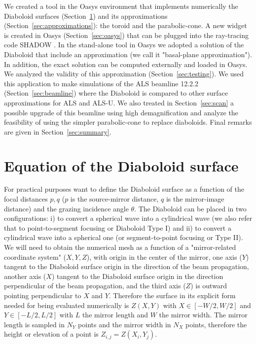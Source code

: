 \documentclass{iucr}              %
\begin{document}

We created a tool in the Oasys environment \cite{codeOASYS} that implements numerically the Diaboloid surfaces (Section~\ref{sec:DiaboloidEqs}) and its approximations (Section~\ref{sec:approximations}): the toroid and the parabolic-cone. A new widget is created in Oasys (Section~\ref{sec:oasys}) that can be plugged into the ray-tracing code SHADOW \cite{codeSHADOW}. 
In the stand-alone tool in Oasys we adopted a solution of the Diaboloid that include an approximation (we call it "basal-plane approximation"). In addition, the exact solution can be computed externally and loaded in Oasys. We analyzed the validity of this approximation (Section~\ref{sec:testing}).
We used this application to make simulations of the ALS beamline 12.2.2 (Section~\ref{sec:beamline}) where the Diaboloid is compared to other surface approximations for ALS and ALS-U. We also treated in Section~\ref{sec:scan} a possible upgrade of this beamline using high demagnification and analyze the feasibility of using the simpler parabolic-cone to replace diaboloids. Final remarks are given in Section~\ref{sec:summary}.

\section{Equation of the Diaboloid surface}
\label{sec:DiaboloidEqs}

For practical purposes want to define the Diaboloid surface as a function of the focal distances $p,q$ ($p$ is the source-mirror distance, $q$ is the mirror-image distance) and the grazing incidence angle $\theta$. The Diaboloid can be placed in two configurations: i) to convert a spherical wave into a cylindrical wave (we also refer that to point-to-segment focusing or Diaboloid Type I) and ii) to convert a cylindrical wave into a spherical one (or segment-to-point focusing or Type II). We will need to obtain the numerical mesh as a function of a "mirror-related coordinate system" ($X,Y,Z$), with origin in the center of the mirror, one axis ($Y$) tangent to the Diaboloid surface origin in the direction of the beam propagation, another axis ($X$) tangent to the Diaboloid surface origin in the direction perpendicular of the beam propagation, and the third axis ($Z$) is outward pointing perpendicular to $X$ and $Y$. Therefore the surface in its explicit form needed for being evaluated numerically is $Z(X,Y)$ with $X \in [-W/2, W/2]$ and $Y \in [-L/2, L/2]$ with $L$ the mirror length and $W$ the mirror width. The mirror length is sampled in $N_Y$ points and the mirror width in $N_X$ points, therefore the height or elevation of a point is $Z_{i,j}=Z(X_i,Y_j)$.
\end{document}
